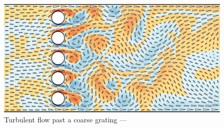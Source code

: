 \documentclass[12pt]{article}
\begin{document}
  \thispagestyle{empty}
  \begin{figure}
    \begin{center}
      \includegraphics[width=\textwidth]{compose.pdf}
    \end{center}
    \caption*{Turbulent flow past a coarse grating
      --- \vfplotversion}
  \end{figure}
\end{document}

